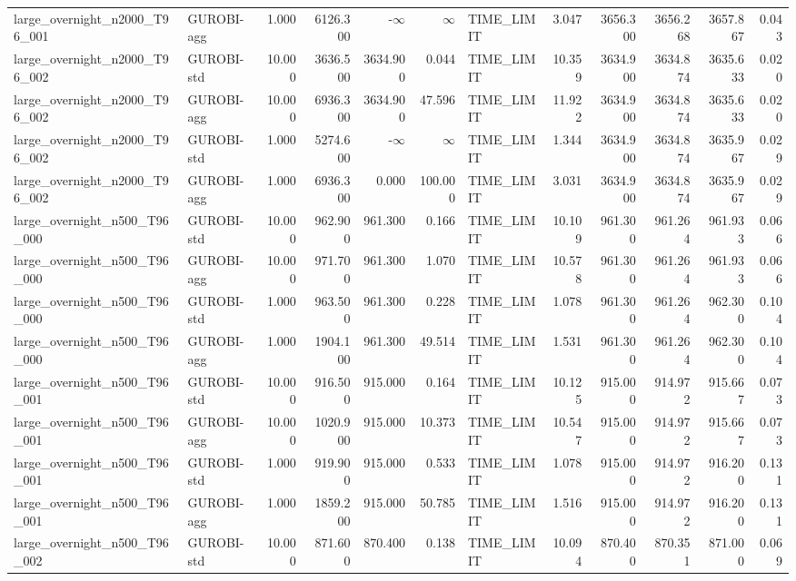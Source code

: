 \begin{table}[htbp]
\begin{tabular}{llrrrrlrrrrr}
large\_overnight\_n2000\_T96\_001 & GUROBI-agg & 1.000 & 6126.300 & -$\infty$ & $\infty$ & TIME\_LIMIT & 3.047 & 3656.300 & 3656.268 & 3657.867 & 0.043 \\
large\_overnight\_n2000\_T96\_002 & GUROBI-std & 10.000 & 3636.500 & 3634.900 & 0.044 & TIME\_LIMIT & 10.359 & 3634.900 & 3634.874 & 3635.633 & 0.020 \\
large\_overnight\_n2000\_T96\_002 & GUROBI-agg & 10.000 & 6936.300 & 3634.900 & 47.596 & TIME\_LIMIT & 11.922 & 3634.900 & 3634.874 & 3635.633 & 0.020 \\
large\_overnight\_n2000\_T96\_002 & GUROBI-std & 1.000 & 5274.600 & -$\infty$ & $\infty$ & TIME\_LIMIT & 1.344 & 3634.900 & 3634.874 & 3635.967 & 0.029 \\
large\_overnight\_n2000\_T96\_002 & GUROBI-agg & 1.000 & 6936.300 & 0.000 & 100.000 & TIME\_LIMIT & 3.031 & 3634.900 & 3634.874 & 3635.967 & 0.029 \\
large\_overnight\_n500\_T96\_000 & GUROBI-std & 10.000 & 962.900 & 961.300 & 0.166 & TIME\_LIMIT & 10.109 & 961.300 & 961.264 & 961.933 & 0.066 \\
large\_overnight\_n500\_T96\_000 & GUROBI-agg & 10.000 & 971.700 & 961.300 & 1.070 & TIME\_LIMIT & 10.578 & 961.300 & 961.264 & 961.933 & 0.066 \\
large\_overnight\_n500\_T96\_000 & GUROBI-std & 1.000 & 963.500 & 961.300 & 0.228 & TIME\_LIMIT & 1.078 & 961.300 & 961.264 & 962.300 & 0.104 \\
large\_overnight\_n500\_T96\_000 & GUROBI-agg & 1.000 & 1904.100 & 961.300 & 49.514 & TIME\_LIMIT & 1.531 & 961.300 & 961.264 & 962.300 & 0.104 \\
large\_overnight\_n500\_T96\_001 & GUROBI-std & 10.000 & 916.500 & 915.000 & 0.164 & TIME\_LIMIT & 10.125 & 915.000 & 914.972 & 915.667 & 0.073 \\
large\_overnight\_n500\_T96\_001 & GUROBI-agg & 10.000 & 1020.900 & 915.000 & 10.373 & TIME\_LIMIT & 10.547 & 915.000 & 914.972 & 915.667 & 0.073 \\
large\_overnight\_n500\_T96\_001 & GUROBI-std & 1.000 & 919.900 & 915.000 & 0.533 & TIME\_LIMIT & 1.078 & 915.000 & 914.972 & 916.200 & 0.131 \\
large\_overnight\_n500\_T96\_001 & GUROBI-agg & 1.000 & 1859.200 & 915.000 & 50.785 & TIME\_LIMIT & 1.516 & 915.000 & 914.972 & 916.200 & 0.131 \\
large\_overnight\_n500\_T96\_002 & GUROBI-std & 10.000 & 871.600 & 870.400 & 0.138 & TIME\_LIMIT & 10.094 & 870.400 & 870.351 & 871.000 & 0.069 \\

\end{tabular}
\end{table}
